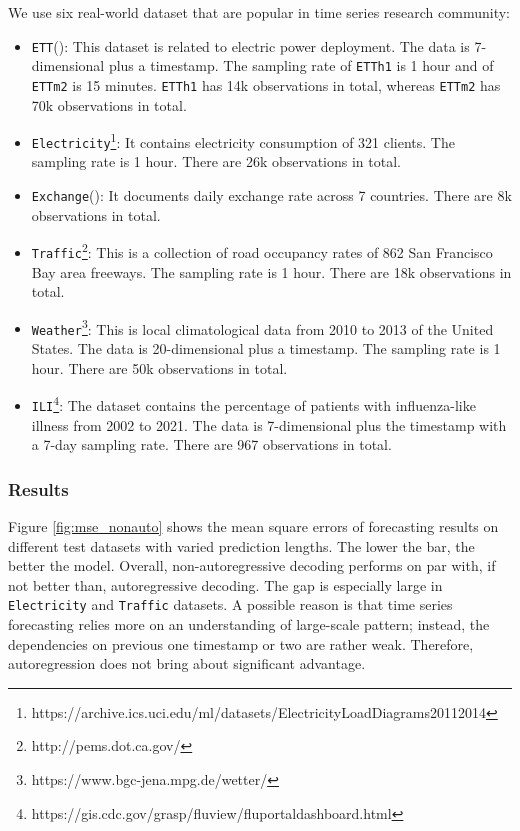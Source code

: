 We use six real-world dataset that are popular in time series research community: \begin{itemize}
    \item \texttt{ETT}(\citet{https://doi.org/10.48550/arxiv.2012.07436}): This dataset is related to electric power deployment. The data is 7-dimensional plus a timestamp. 
    The sampling rate of \texttt{ETTh1} is 1 hour and of \texttt{ETTm2} is 15 minutes. 
    \texttt{ETTh1} has 14k observations in total, whereas \texttt{ETTm2} has 70k observations in total. 
    \item \texttt{Electricity}\footnote{https://archive.ics.uci.edu/ml/datasets/ElectricityLoadDiagrams20112014}: It contains electricity consumption of 321 clients. The sampling rate is 1 hour. There are 26k observations in total. 
    \item \texttt{Exchange}(\citet{https://doi.org/10.48550/arxiv.1703.07015}): It documents daily exchange rate across 7 countries. There are 8k observations in total. 
    \item \texttt{Traffic}\footnote{http://pems.dot.ca.gov/}: This is a collection of road occupancy rates of 862 San Francisco Bay area freeways. The sampling rate is 1 hour. There are 18k observations in total. 
    \item \texttt{Weather}\footnote{https://www.bgc-jena.mpg.de/wetter/}: This is local climatological data from 2010 to 2013 of the United States. The data is 20-dimensional plus a timestamp. 
    The sampling rate is 1 hour. There are 50k observations in total. 
    \item \texttt{ILI}\footnote{https://gis.cdc.gov/grasp/fluview/fluportaldashboard.html}: The dataset contains the percentage of patients with influenza-like illness from 2002 to 2021. 
    The data is 7-dimensional plus the timestamp with a 7-day sampling rate. There are 967 observations in total. 
\end{itemize}

\subsubsection{Results}
Figure \ref{fig:mse_nonauto} shows the mean square errors of forecasting results on different test datasets with varied prediction lengths. 
The lower the bar, the better the model. 
Overall, non-autoregressive decoding performs on par with, if not better than, autoregressive decoding. 
The gap is especially large in \texttt{Electricity} and \texttt{Traffic} datasets. 
A possible reason is that time series forecasting relies more on an understanding of large-scale pattern; 
instead, the dependencies on previous one timestamp or two are rather weak. 
Therefore, autoregression does not bring about significant advantage. 

